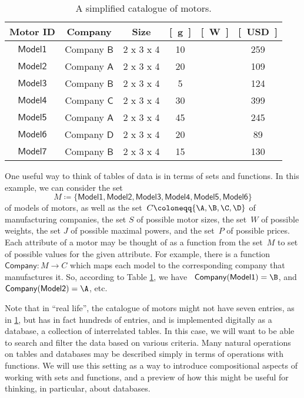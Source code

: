 \begin{table}[h]
    \centering
    \begin{tabular}{c|c|c|c|c|c}
         Motor ID & Company& Size & \unit[Weight]{[g]} & \unit[Max Power]{[W]} & \unit[price]{[USD]} \\
         \hline
         $\mathsf{Model1}$&Company $\mathsf{B}$ & 2 x 3 x 4& 10 & &259\\
         $\mathsf{Model2}$&Company $\mathsf{A}$ &2 x 3 x 4& 20 & &109\\
         $\mathsf{Model3}$&Company $\mathsf{B}$ &2 x 3 x 4& 5 & &124\\
         $\mathsf{Model4}$&Company $\mathsf{C}$ &2 x 3 x 4& 30 & &399\\
         $\mathsf{Model5}$&Company $\mathsf{A}$ &2 x 3 x 4& 45 & &245  \\
        $\mathsf{Model6}$&Company $\mathsf{D}$ & 2 x 3 x 4& 20 & &89\\
        $\mathsf{Model7}$&Company $\mathsf{B}$ & 2 x 3 x 4& 15 &&130
    \end{tabular}
    \caption{A simplified catalogue of motors.}
    \label{tab:currencycompanies}
\end{table}
One useful way to think of tables of data is in terms of sets and functions. In this example, we can consider the set
\begin{equation*}
M \coloneqq \{ \mathsf{Model1}, \mathsf{Model2}, \mathsf{Model3}, \mathsf{Model4}, \mathsf{Model5}, \mathsf{Model6} \}
\end{equation*}
of models of motors, as well as the set~$C \coloneqq \{ \A, \B, \C, \D \}$ of manufacturing companies, the set $S$ of possible motor sizes, the set~$W$ of possible weights, the set $J$ of possible maximal powers, and the set~$P$ of possible prices. Each attribute of a motor may be thought of as a function from the set~$M$ to set of possible values for the given attribute. For example, there is a function~$\mathsf{Company}\colon M \to C$ which maps each model to the corresponding company that manufactures it. So, according to Table \ref{tab:currencycompanies}, we have ~$\mathsf{Company}(\mathsf{Model1}) = \B$, and~$\mathsf{Company}(\mathsf{Model2}) = \A$, etc.

Note that in ``real life'', the catalogue of motors might not have seven entries, as in \cref{tab:currencycompanies}, but has in fact hundreds of entries, and is implemented digitally as a database,  a collection of interrelated tables. In this case, we will want to be able to search and filter the data based on various criteria. Many natural operations on tables and databases may be described simply in terms of operations with functions. We will use this setting as a way to introduce compositional aspects of working with sets and functions, and a preview of how this might be useful for thinking, in particular, about databases.

